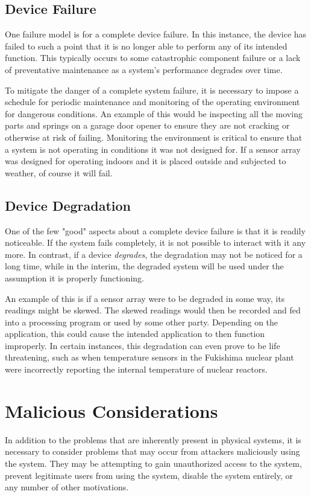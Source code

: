 \subsection{Device Failure}
One failure model is for a complete device failure. In this instance, the device has failed to such a point that it is no
longer able to perform any of its intended function. This typically occurs to some catastrophic component failure or a 
lack of preventative maintenance as a system's performance degrades over time.

To mitigate the danger of a complete system failure, it is necessary to impose a schedule for periodic maintenance and
monitoring of the operating environment for dangerous conditions. An example of this would be inspecting all the moving
parts and springs on a garage door opener to ensure they are not cracking or otherwise at risk of failing. 
Monitoring the environment is critical to ensure that a system is not operating in conditions it was not designed for. If a sensor
array was designed for operating indoors and it is placed outside and subjected to weather, of course it will fail.


\subsection{Device Degradation}
One of the few "good" aspects about a complete device failure is that it is readily noticeable. If the system fails completely,
it is not possible to interact with it any more. In contrast, if a device \textit{degrades}, the degradation may not be noticed
for a long time, while in the interim, the degraded system will be used under the assumption it is properly functioning.

An example of this is if a sensor array were to be degraded in some way, its readings might be skewed. The skewed readings
would then be recorded and fed into a processing program or used by some other party. Depending on the application, this
could cause the intended application to then function improperly. In certain instances, this degradation can even prove to be
life threatening, such as when temperature sensors in the Fukishima nuclear plant were incorrectly reporting the internal
temperature of nuclear reactors.~\cite{fukushima}

\section{Malicious Considerations}
In addition to the problems that are inherently present in physical systems, it is necessary to consider problems that may
occur from attackers maliciously using the system. They may be attempting to gain unauthorized access to the system,
prevent legitimate users from using the system, disable the system entirely, or any number of other motivations.

